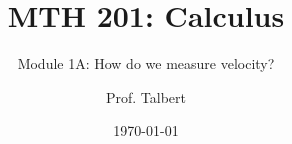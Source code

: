 \documentclass{beamer}
\title{MTH 201: Calculus}
\subtitle{Module 1A: How do we measure velocity?}
\author{Prof. Talbert}
\institute{GVSU}
\date{\today}
\begin{document}
\frame{\titlepage}



 
\end{document}
